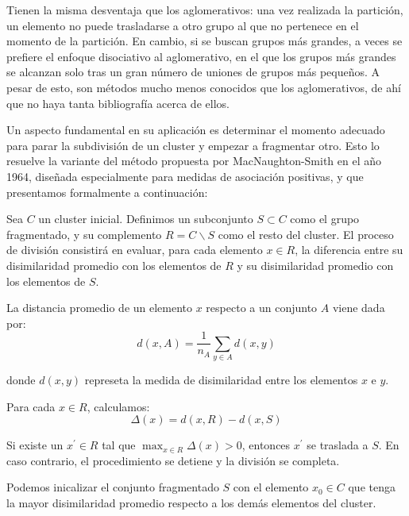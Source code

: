 Tienen la misma desventaja que los aglomerativos: una vez realizada la partición, un elemento no puede trasladarse a otro grupo al que no pertenece en el momento 
de la partición. En cambio, si se buscan grupos más grandes, a veces se prefiere el enfoque disociativo al aglomerativo, en el que los grupos más grandes se alcanzan
solo tras un gran número de uniones de grupos más pequeños. A pesar de esto, son métodos mucho menos conocidos que los aglomerativos, de ahí que no haya tanta 
bibliografía acerca de ellos. \newline

Un aspecto fundamental en su aplicación es determinar el momento adecuado para parar la subdivisión de un cluster y empezar a fragmentar otro. Esto lo resuelve la 
variante del método propuesta por MacNaughton-Smith en el año 1964, diseñada especialmente para medidas de asociación positivas, y que presentamos formalmente
a continuación: \newline

Sea $C$ un cluster inicial. Definimos un subconjunto $S \subset C$ como el grupo fragmentado, y su complemento $R = C\backslash S$ como el resto del cluster. El 
proceso de división consistirá en evaluar, para cada elemento $x \in R$, la diferencia entre su disimilaridad promedio con los elementos de $R$ y su disimilaridad 
promedio con los elementos de $S$. \newline

La distancia promedio de un elemento $x$ respecto a un conjunto $A$ viene dada por: 
\[
d(x,A) = \frac{1}{n_{A}} \sum_{y\in A} d(x,y)
\]

donde $d(x,y)$ represeta la medida de disimilaridad entre los elementos $x$ e $y$.\newline

Para cada $x\in R$, calculamos:
\[
\Delta (x) = d(x,R) - d(x,S)
\]

Si existe un $x^{'} \in R$ tal que $\max_{x \in R}{\Delta (x)} > 0$, entonces $x^{'}$ se traslada a $S$. En caso contrario, el procedimiento se detiene y la división
se completa. \newline

\begin{nota}
    Podemos inicalizar el conjunto fragmentado $S$ con el elemento $x_{0} \in C$ que tenga la mayor disimilaridad promedio respecto a los demás elementos del cluster.
\end{nota}



